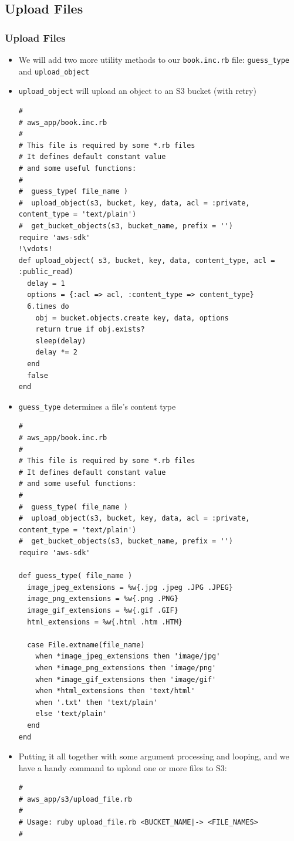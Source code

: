 \documentclass{beamer}
\begin{document}
\subsection{Upload Files}
\begin{frame}
\frametitle{Upload Files}
\begin{itemize}
 \item We will add two more utility methods to our \texttt{book.inc.rb} file: \texttt{guess\_type} and \texttt{upload\_object}
 \item \texttt{upload\_object} will upload an object to an S3 bucket (with retry)
\lstset{language=Ruby, style=eclipse}
\begin{lstlisting}[escapechar=!]
#
# aws_app/book.inc.rb
#
# This file is required by some *.rb files
# It defines default constant value
# and some useful functions:
#
#  guess_type( file_name )
#  upload_object(s3, bucket, key, data, acl = :private, content_type = 'text/plain')
#  get_bucket_objects(s3, bucket_name, prefix = '')
require 'aws-sdk'
!\vdots!
def upload_object( s3, bucket, key, data, content_type, acl = :public_read)
  delay = 1
  options = {:acl => acl, :content_type => content_type}
  6.times do
    obj = bucket.objects.create key, data, options
    return true if obj.exists?
    sleep(delay)
    delay *= 2
  end
  false
end
\end{lstlisting}

\item \texttt{guess\_type} determines a file's content type

\lstset{language=Ruby, style=eclipse}
\begin{lstlisting}[escapechar=!]
#
# aws_app/book.inc.rb
#
# This file is required by some *.rb files
# It defines default constant value
# and some useful functions:
#
#  guess_type( file_name )
#  upload_object(s3, bucket, key, data, acl = :private, content_type = 'text/plain')
#  get_bucket_objects(s3, bucket_name, prefix = '')
require 'aws-sdk'

def guess_type( file_name )
  image_jpeg_extensions = %w{.jpg .jpeg .JPG .JPEG}
  image_png_extensions = %w{.png .PNG}
  image_gif_extensions = %w{.gif .GIF}
  html_extensions = %w{.html .htm .HTM}

  case File.extname(file_name)
    when *image_jpeg_extensions then 'image/jpg'
    when *image_png_extensions then 'image/png'
    when *image_gif_extensions then 'image/gif'
    when *html_extensions then 'text/html'
    when '.txt' then 'text/plain'
    else 'text/plain'
  end
end
\end{lstlisting}
\item Putting it all together with some argument processing and looping, and
we have a handy command to upload one or more files to S3:
\lstset{language=Ruby, style=eclipse}
\begin{lstlisting}[escapechar=!]
#
# aws_app/s3/upload_file.rb
#
# Usage: ruby upload_file.rb <BUCKET_NAME|-> <FILE_NAMES>
#


\end{lstlisting}
\end{itemize}
\end{frame}
\end{document}
